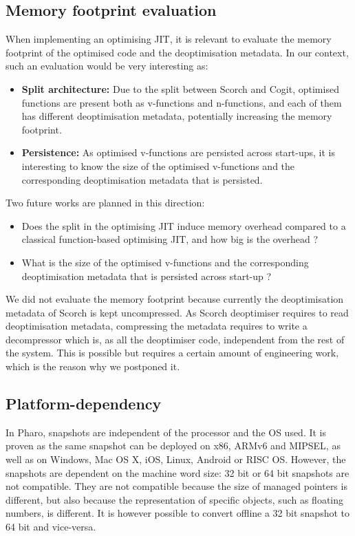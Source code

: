 \documentclass[a4paper,12pt,twoside]{../includes/ThesisStyle}
\begin{document}
\subsection{Memory footprint evaluation}
\label{ss:FWMemFootprint}

When implementing an optimising JIT, it is relevant to evaluate the memory footprint of the optimised code and the deoptimisation metadata. In our context, such an evaluation would be very interesting as:
\begin{itemize}
	\item \textbf{Split architecture:} Due to the split between Scorch and Cogit, optimised functions are present both as v-functions and n-functions, and each of them has different deoptimisation metadata, potentially increasing the memory footprint. 
	\item \textbf{Persistence:} As optimised v-functions are persisted across start-ups, it is interesting to know the size of the optimised v-functions and the corresponding deoptimisation metadata that is persisted.
\end{itemize}

Two future works are planned in this direction:
\begin{itemize}
	\item Does the split in the optimising JIT induce memory overhead compared to a classical function-based optimising JIT, and how big is the overhead ?
	\item What is the size of the optimised v-functions and the corresponding deoptimisation metadata that is persisted across start-up ?
\end{itemize}

We did not evaluate the memory footprint because currently the deoptimisation metadata of Scorch is kept uncompressed. As Scorch deoptimiser requires to read deoptimisation metadata, compressing the metadata requires to write a decompressor which is, as all the deoptimiser code, independent from the rest of the system. This is possible but requires a certain amount of engineering work, which is the reason why we postponed it.

\subsection{Platform-dependency}
\label{ss:FWPlatDep}

In Pharo, snapshots are independent of the processor and the OS used. It is proven as the same snapshot can be deployed on x86, ARMv6 and MIPSEL, as well as on Windows, Mac OS X, iOS, Linux, Android or RISC OS. However, the snapshots are dependent on the machine word size: 32 bit or 64 bit snapshots are not compatible. They are not compatible because the size of managed pointers is different, but also because the representation of specific objects, such as floating numbers, is different. It is however possible to convert offline a 32 bit snapshot to 64 bit and vice-versa. 
\end{document}
